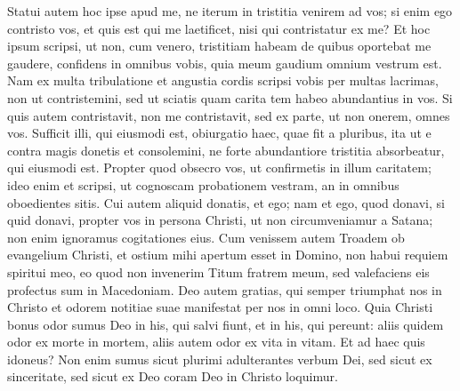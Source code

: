 \begin{biblechapter}
\begin{biblechapter}
\verse Statui autem hoc ipse apud me, ne iterum in tristitia venirem ad vos; 
 \verse si enim ego contristo vos, et quis est qui me laetificet, nisi qui contristatur ex me? 
\verse Et hoc ipsum scripsi, ut non, cum venero, tristitiam habeam de quibus oportebat me gaudere, confidens in omnibus vobis, quia meum gaudium omnium vestrum est. 
\verse Nam ex multa tribulatione et angustia cordis scripsi vobis per multas lacrimas, non ut contristemini, sed ut sciatis quam carita tem habeo abundantius in vos. 
\verse Si quis autem contristavit, non me contristavit, sed ex parte, ut non onerem, omnes vos. 
\verse Sufficit illi, qui eiusmodi est, obiurgatio haec, quae fit a pluribus, 
\verse ita ut e contra magis donetis et consolemini, ne forte abundantiore tristitia absorbeatur, qui eiusmodi est. 
\verse Propter quod obsecro vos, ut confirmetis in illum caritatem; 
 \verse ideo enim et scripsi, ut cognoscam probationem vestram, an in omnibus oboedientes sitis. 
\verse Cui autem aliquid donatis, et ego; nam et ego, quod donavi, si quid donavi, propter vos in persona Christi, 
\verse ut non circumveniamur a Satana; non enim ignoramus cogitationes eius.
 \verse Cum venissem autem Troadem ob evangelium Christi, et ostium mihi apertum esset in Domino, 
\verse non habui requiem spiritui meo, eo quod non invenerim Titum fratrem meum, sed valefaciens eis profectus sum in Macedoniam. 
\verse Deo autem gratias, qui semper triumphat nos in Christo et odorem notitiae suae manifestat per nos in omni loco. 
\verse Quia Christi bonus odor sumus Deo in his, qui salvi fiunt, et in his, qui pereunt: 
\verse aliis quidem odor ex morte in mortem, aliis autem odor ex vita in vitam. Et ad haec quis idoneus? 
\verse Non enim sumus sicut plurimi adulterantes verbum Dei, sed sicut ex sinceritate, sed sicut ex Deo coram Deo in Christo loquimur.
 

\end{biblechapter}
\end{biblechapter}
